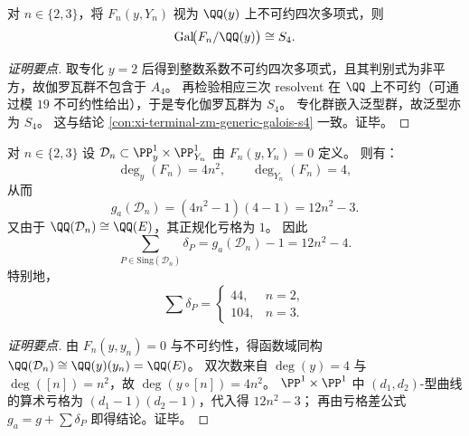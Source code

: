 \begin{conclusion}\label{con:xi-terminal-zm-elliptic-weight-modular-galois-s4-double-triple}
对 \(n\in\{2,3\}\)，将 \(F_n(y,Y_n)\) 视为 \(\QQ(y)\) 上不可约四次多项式，则
\[
\mathrm{Gal}\!\bigl(F_n/\QQ(y)\bigr)\cong S_4.
\]
\end{conclusion}
\begin{proof}[证明要点]
取专化 \(y=2\) 后得到整数系数不可约四次多项式，且其判别式为非平方，故伽罗瓦群不包含于 \(A_4\)。
再检验相应三次 resolvent 在 \(\QQ\) 上不可约（可通过模 \(19\) 不可约性给出），于是专化伽罗瓦群为 \(S_4\)。
专化群嵌入泛型群，故泛型亦为 \(S_4\)。
这与结论 \ref{con:xi-terminal-zm-generic-galois-s4} 一致。证毕。
\end{proof}

\begin{conclusion}[\texorpdfstring{$\PP^1\times\PP^1$}{P1xP1} 中对应曲线的奇点预算：\texorpdfstring{$\sum\delta_P=12n^2-4$}{sum delta = 12 n^2 - 4}]\label{con:xi-terminal-zm-elliptic-weight-modular-delta-budget}
对 \(n\in\{2,3\}\) 设 \(\mathcal D_n\subset\PP^1_y\times\PP^1_{Y_n}\) 由 \(F_n(y,Y_n)=0\) 定义。
则有：
\[
\deg_y(F_n)=4n^2,\qquad \deg_{Y_n}(F_n)=4,
\]
从而
\[
g_a(\mathcal D_n)=(4n^2-1)(4-1)=12n^2-3.
\]
又由于 \(\QQ(\mathcal D_n)\cong\QQ(E)\)，其正规化亏格为 \(1\)。
因此
\[
\sum_{P\in\mathrm{Sing}(\mathcal D_n)}\delta_P
=g_a(\mathcal D_n)-1
=12n^2-4.
\]
特别地，
\[
\sum\delta_P=
\begin{cases}
44,& n=2,\\
104,& n=3.
\end{cases}
\]
\end{conclusion}
\begin{proof}[证明要点]
由 \(F_n(y,y_n)=0\) 与不可约性，得函数域同构
\(
\QQ(\mathcal D_n)\cong \QQ(y)(y_n)=\QQ(E)
\)。
双次数来自 \(\deg(y)=4\) 与 \(\deg([n])=n^2\)，故 \(\deg(y\circ[n])=4n^2\)。
\(\PP^1\times\PP^1\) 中 \((d_1,d_2)\)-型曲线的算术亏格为 \((d_1-1)(d_2-1)\)，代入得 \(12n^2-3\)；
再由亏格差公式 \(g_a=g+\sum\delta_P\) 即得结论。证毕。
\end{proof}
